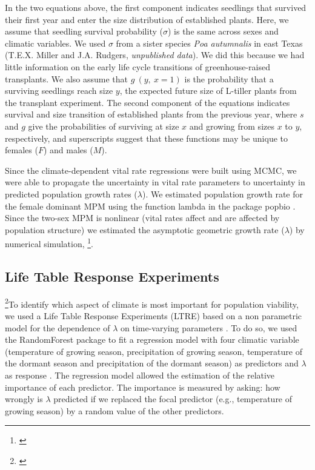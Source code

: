 \documentclass[12pt]{article}
\newcommand{\jacob}[2]{{\color{blue}{#1}}\footnote{\textit{\color{blue}{#2}}}}
\begin{document}
\noindent In the two equations above, the first component indicates seedlings that survived their first year and enter the size distribution of established plants.
Here, we assume that seedling survival probability ($\sigma$) is the same across sexes and climatic variables.
We used $\sigma$ from a sister species \textit{Poa autumnalis} in east Texas (T.E.X. Miller and J.A. Rudgers, \textit{unpublished data}). 
We did this because we had little information on the early life cycle transitions of greenhouse-raised transplants.
We also assume that $g\ (y,\ x=1)$ is the probability that a surviving seedlings reach size $y$, the expected future size of L-tiller plants from the transplant experiment.
The second component of the equations indicates survival and size transition of established plants from the previous year, where $s$ and $g$ give the probabilities of surviving at size $x$ and growing from sizes $x$ to $y$, respectively, and superscripts suggest that these functions may be unique to females ($F$) and males ($M$).

Since the climate-dependent vital rate regressions were built using MCMC, we were able to propagate the uncertainty in vital rate parameters to uncertainty in predicted population growth rates ($\lambda$).
We estimated population growth rate for the female dominant MPM using the function lambda in the package popbio \citep{popbio}. 
Since the two-sex MPM is nonlinear (vital rates affect and are affected by population structure) we estimated the asymptotic geometric growth rate ($\lambda$) by numerical simulation, \jacob{and repeated this across a range of climate}{I think the key thing here is that the estimation of lambda was not from an eigen value as opposed to the female dominant.I added an explanation of "vital rates affect and are affected by population structure" in the first paragraph}.


\subsection*{Life Table Response Experiments}
\jacob{}{I modified this section. I understand your concern about accounting for the second order term in the first LTRE but I don't think we should be worry about that here. I am saying that because the technic here is similar to an ANOVA-- we dropped one predictor to see how much the error goes up. That's why we don't account for sex or size because lambda account for them already.}To identify which aspect of climate is most important for population viability, we used a Life Table Response Experiments (LTRE)  based on a non parametric model for the dependence of $\lambda$ on time-varying parameters \citep{ellner2016data}. 
To do so, we used the RandomForest package to fit a regression model with four climatic variable (temperature of growing season, precipitation of growing season, temperature of the dormant season and precipitation of the dormant season)
as predictors  and $\lambda$ as response \citep{liaw2002classification}.
The regression model allowed the estimation of the relative importance of each predictor.  
The importance is measured by asking: how wrongly is $\lambda$ predicted if we replaced the focal predictor (e.g., temperature of growing season) by a random value of the other predictors.
\end{document}
